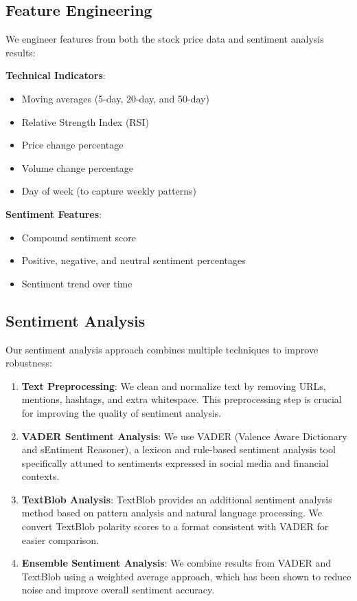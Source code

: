 \documentclass[review]{elsarticle}
\begin{document}
\subsection{Feature Engineering}

We engineer features from both the stock price data and sentiment analysis results:

\textbf{Technical Indicators}:
\begin{itemize}
    \item Moving averages (5-day, 20-day, and 50-day)
    \item Relative Strength Index (RSI)
    \item Price change percentage
    \item Volume change percentage
    \item Day of week (to capture weekly patterns)
\end{itemize}

\textbf{Sentiment Features}:
\begin{itemize}
    \item Compound sentiment score
    \item Positive, negative, and neutral sentiment percentages
    \item Sentiment trend over time
\end{itemize}

\subsection{Sentiment Analysis}

Our sentiment analysis approach combines multiple techniques to improve robustness:

\begin{enumerate}
    \item \textbf{Text Preprocessing}: We clean and normalize text by removing URLs, mentions, hashtags, and extra whitespace. This preprocessing step is crucial for improving the quality of sentiment analysis.
    
    \item \textbf{VADER Sentiment Analysis}: We use VADER (Valence Aware Dictionary and sEntiment Reasoner), a lexicon and rule-based sentiment analysis tool specifically attuned to sentiments expressed in social media and financial contexts.
    
    \item \textbf{TextBlob Analysis}: TextBlob provides an additional sentiment analysis method based on pattern analysis and natural language processing. We convert TextBlob polarity scores to a format consistent with VADER for easier comparison.
    
    \item \textbf{Ensemble Sentiment Analysis}: We combine results from VADER and TextBlob using a weighted average approach, which has been shown to reduce noise and improve overall sentiment accuracy.
\end{enumerate}
\end{document}

